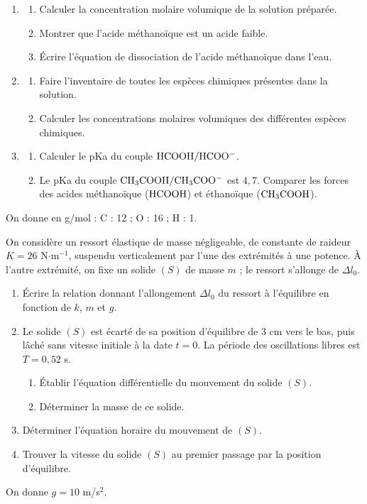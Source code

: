 \documentclass[11pt]{article}
\begin{document}
\begin{enumerate}
  \item \begin{enumerate}[label=\alph*.]
    \item Calculer la concentration molaire volumique de la solution préparée.
    \item Montrer que l'acide méthanoïque est un acide faible.
    \item Écrire l'équation de dissociation de l'acide méthanoïque dans l'eau.
  \end{enumerate}
  \item \begin{enumerate}[label=\alph*.]
    \item Faire l'inventaire de toutes les espèces chimiques présentes dans la solution.
    \item Calculer les concentrations molaires volumiques des différentes espèces chimiques.
  \end{enumerate}
  \item \begin{enumerate}[label=\alph*.]
    \item Calculer le pKa du couple $\mathrm{HCOOH/HCOO^-}$.
    \item Le pKa du couple $\mathrm{CH_3COOH/CH_3COO^-}$ est $4{,}7$. Comparer les forces des acides méthanoïque ($\mathrm{HCOOH}$) et éthanoïque ($\mathrm{CH_3COOH}$).
  \end{enumerate}
\end{enumerate}
\noindent On donne en g/mol : C : 12 ; O : 16 ; H : 1.


On considère un ressort élastique de masse négligeable, de constante de raideur $K = 26$ N$\cdot$m$^{-1}$, suspendu verticalement par l'une des extrémités à une potence. À l'autre extrémité, on fixe un solide $(S)$ de masse $m$ ; le ressort s'allonge de $\Delta l_0$.

\begin{enumerate}
  \item Écrire la relation donnant l'allongement $\Delta l_0$ du ressort à l'équilibre en fonction de $k$, $m$ et $g$.
  \item Le solide $(S)$ est écarté de sa position d'équilibre de 3 cm vers le bas, puis lâché sans vitesse initiale à la date $t = 0$. La période des oscillations libres est $T = 0{,}52$ s.
  \begin{enumerate}[label=\alph*.]
    \item Établir l'équation différentielle du mouvement du solide $(S)$.
    \item Déterminer la masse de ce solide.
  \end{enumerate}
  \item Déterminer l'équation horaire du mouvement de $(S)$.
  \item Trouver la vitesse du solide $(S)$ au premier passage par la position d'équilibre.
\end{enumerate}
\noindent On donne $g = 10$ m/s$^2$.
\end{document}
